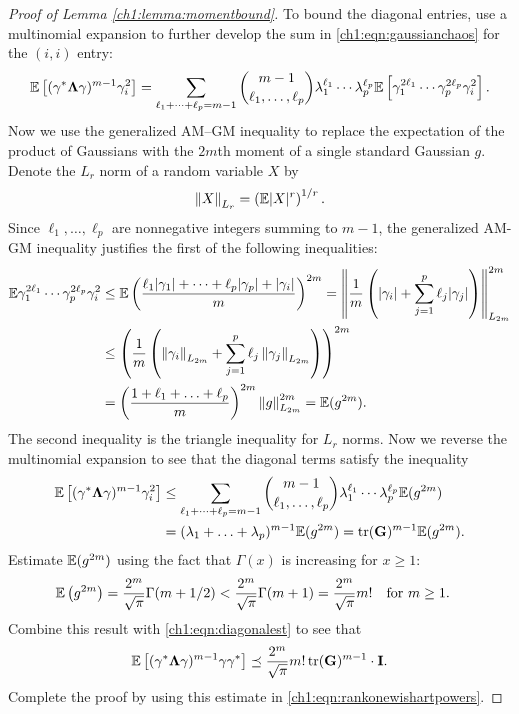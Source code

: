 \begin{proof}[Proof of Lemma \ref{ch1:lemma:momentbound}]
To bound the diagonal entries, use a multinomial expansion to further develop
the sum in \eqref{ch1:eqn:gaussianchaos} for the $(i,i)$ entry:
\[
 \E\left[(\vec{\gamma}^\star \mat{\Lambda} \vec{\gamma})^{m-1} \gamma_i^2
\right]  
= \sum_{\ell_1 + \cdots +\ell_p = m-1} \binom{m-1}{\ell_1, \ldots, \ell_p}
\lambda_1^{\ell_1} \cdots \lambda_p^{\ell_p} \E\left[\gamma_1^{2\ell_1}
\cdots \gamma_p^{2\ell_p} \gamma_i^2 \right].
\]
Now we use the generalized AM--GM inequality to replace the expectation of the
product of Gaussians with the $2m$th moment of a single standard Gaussian $g$. 
Denote the $L_r$ norm of a random variable $X$ by
\[ 
  \lnorm{r}{X} = \left(\E |X|^r \right)^{1/r}. 
\]
Since $\ell_1, \ldots, \ell_p$ are nonnegative integers summing to $m-1$, the
generalized AM-GM inequality justifies the first of the following inequalities:
\begin{align*}
\E \gamma_1^{2\ell_1} \cdots \gamma_p^{2\ell_p} \gamma_i^2 & \leq  \E
\left(\frac{\ell_1 |\gamma_1| + \cdots + \ell_p |\gamma_p| +
|\gamma_i|}{m}\right)^{2m} =
 \lnorm{2m}{ \frac{1}{m} \left(|\gamma_i| + \sum_{j=1}^p \ell_j |\gamma_j|
\right) }^{2m} \\
 & \leq \left( \frac{1}{m} \left( \lnorm{2m}{\gamma_i} + \sum_{j=1}^p \ell_j
\lnorm{2m}{\gamma_j} \right) \right)^{2m} \\
 & = \left(\frac{1 + \ell_1 + \ldots + \ell_p}{m} \right)^{2m}
\lnorm{2m}{g}^{2m} = \E (g^{2m}).  
\end{align*}
The second inequality is the triangle inequality for $L_r$ norms. Now we reverse
the multinomial expansion to see that the diagonal terms satisfy the inequality
\begin{align}
\E\left[(\vec{\gamma}^\star \mat{\Lambda} \vec{\gamma})^{m-1}\gamma_i^2\right] &
\leq \sum_{\ell_1 + \cdots + \ell_p = m-1} \binom{m-1}{\ell_1, \ldots,
\ell_p } \lambda_1^{\ell_1} \cdots \lambda_p^{\ell_p} \E (g^{2m}) \notag
\\
&  = (\lambda_1 + \ldots + \lambda_p)^{m-1}\E ( g^{2m}) = \tr(\mat{G})^{m-1} \E
(g^{2m}). 
\label{ch1:eqn:diagonalest}
\end{align}
Estimate $\E(g^{2m})$ using the fact that $\Gamma(x)$ is increasing for $x \geq
1:$
\begin{align*}
\E \left( g^{2m} \right) & = \frac{2^m}{\sqrt{\pi}} \Gamma(m + 1/2) <
\frac{2^m}{\sqrt{\pi}} \Gamma(m+1) = \frac{2^m}{\sqrt{\pi}} m! \quad \text{for }
m \geq 1.
\end{align*}
Combine this result with \eqref{ch1:eqn:diagonalest} to see that
\[
\E\left[(\vec{\gamma}^\star \mat{\Lambda}
\vec{\gamma})^{m-1}\vec{\gamma}\vec{\gamma}^\star \right] \preceq
\frac{2^m}{\sqrt{\pi}} m! \tr(\mat{G})^{m-1} \cdot \mathbf{I}. 
\] 
Complete the proof by using this estimate in \eqref{ch1:eqn:rankonewishartpowers}.
\end{proof}

